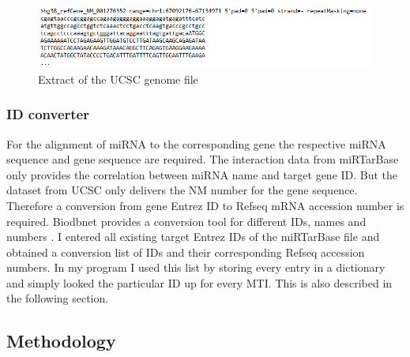 \documentclass[12pt]{article}
\begin{document}
\begin{figure}[h]
\centering
\includegraphics[width=\textwidth]{results/ucsc.png}
\caption{Extract of the UCSC genome file}
\label{ucsc_scrot}
\end{figure}


\vspace{1cm}



\subsubsection{ID converter}
\label{sec:id}
For the alignment of miRNA to the corresponding gene the respective miRNA sequence and gene sequence are required. The interaction data from miRTarBase only provides the correlation between miRNA name and target gene ID. But the dataset from UCSC only delivers the NM number for the gene sequence. Therefore a conversion from gene Entrez ID to Refseq mRNA accession number is required. Biodbnet provides a conversion tool for different IDs, names and numbers \cite{biodb}. I entered all existing target Entrez IDs of the miRTarBase file and obtained a conversion list of IDs and their corresponding Refseq accession numbers. In my program I used this list by storing every entry in a dictionary and simply looked the particular ID up for every MTI. This is also described in the following section.
 


\vspace{1cm}


\subsection{Methodology}
\end{document}
